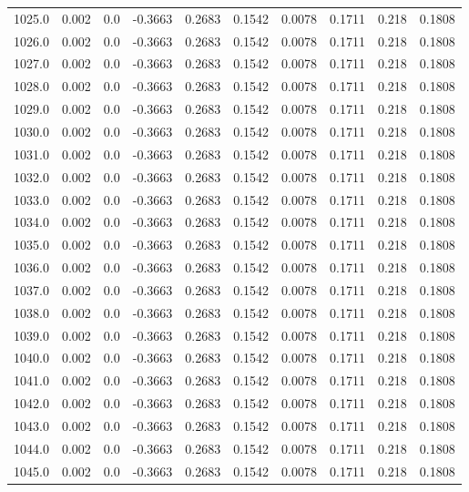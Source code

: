 \begin{longtable}{lrrrrrrrrr}
1025.0 & 0.002 & 0.0 & -0.3663 & 0.2683 & 0.1542 & 0.0078 & 0.1711 & 0.218 & 0.1808 \\
1026.0 & 0.002 & 0.0 & -0.3663 & 0.2683 & 0.1542 & 0.0078 & 0.1711 & 0.218 & 0.1808 \\
1027.0 & 0.002 & 0.0 & -0.3663 & 0.2683 & 0.1542 & 0.0078 & 0.1711 & 0.218 & 0.1808 \\
1028.0 & 0.002 & 0.0 & -0.3663 & 0.2683 & 0.1542 & 0.0078 & 0.1711 & 0.218 & 0.1808 \\
1029.0 & 0.002 & 0.0 & -0.3663 & 0.2683 & 0.1542 & 0.0078 & 0.1711 & 0.218 & 0.1808 \\
1030.0 & 0.002 & 0.0 & -0.3663 & 0.2683 & 0.1542 & 0.0078 & 0.1711 & 0.218 & 0.1808 \\
1031.0 & 0.002 & 0.0 & -0.3663 & 0.2683 & 0.1542 & 0.0078 & 0.1711 & 0.218 & 0.1808 \\
1032.0 & 0.002 & 0.0 & -0.3663 & 0.2683 & 0.1542 & 0.0078 & 0.1711 & 0.218 & 0.1808 \\
1033.0 & 0.002 & 0.0 & -0.3663 & 0.2683 & 0.1542 & 0.0078 & 0.1711 & 0.218 & 0.1808 \\
1034.0 & 0.002 & 0.0 & -0.3663 & 0.2683 & 0.1542 & 0.0078 & 0.1711 & 0.218 & 0.1808 \\
1035.0 & 0.002 & 0.0 & -0.3663 & 0.2683 & 0.1542 & 0.0078 & 0.1711 & 0.218 & 0.1808 \\
1036.0 & 0.002 & 0.0 & -0.3663 & 0.2683 & 0.1542 & 0.0078 & 0.1711 & 0.218 & 0.1808 \\
1037.0 & 0.002 & 0.0 & -0.3663 & 0.2683 & 0.1542 & 0.0078 & 0.1711 & 0.218 & 0.1808 \\
1038.0 & 0.002 & 0.0 & -0.3663 & 0.2683 & 0.1542 & 0.0078 & 0.1711 & 0.218 & 0.1808 \\
1039.0 & 0.002 & 0.0 & -0.3663 & 0.2683 & 0.1542 & 0.0078 & 0.1711 & 0.218 & 0.1808 \\
1040.0 & 0.002 & 0.0 & -0.3663 & 0.2683 & 0.1542 & 0.0078 & 0.1711 & 0.218 & 0.1808 \\
1041.0 & 0.002 & 0.0 & -0.3663 & 0.2683 & 0.1542 & 0.0078 & 0.1711 & 0.218 & 0.1808 \\
1042.0 & 0.002 & 0.0 & -0.3663 & 0.2683 & 0.1542 & 0.0078 & 0.1711 & 0.218 & 0.1808 \\
1043.0 & 0.002 & 0.0 & -0.3663 & 0.2683 & 0.1542 & 0.0078 & 0.1711 & 0.218 & 0.1808 \\
1044.0 & 0.002 & 0.0 & -0.3663 & 0.2683 & 0.1542 & 0.0078 & 0.1711 & 0.218 & 0.1808 \\
1045.0 & 0.002 & 0.0 & -0.3663 & 0.2683 & 0.1542 & 0.0078 & 0.1711 & 0.218 & 0.1808 \\

\end{longtable}
